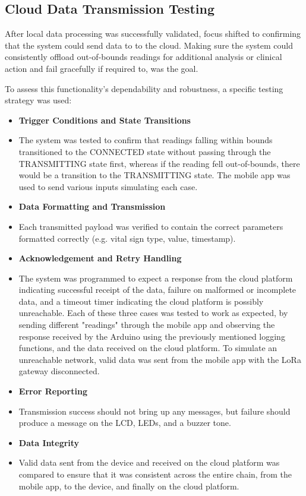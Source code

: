\subsection{Cloud Data Transmission Testing}
After local data processing was successfully validated, focus shifted to confirming that the system could send data to to the cloud. Making sure the system could consistently offload out-of-bounds readings for additional analysis or clinical action and fail gracefully if required to, was the goal.

To assess this functionality's dependability and robustness, a specific testing strategy was used:

\clearpage
\begin{itemize}
	\item \textbf{Trigger Conditions and State Transitions}
	\item[] The system was tested to confirm that readings falling within bounds transitioned to the CONNECTED state without passing through the TRANSMITTING state first, whereas if the reading fell out-of-bounds, there would be a transition to the TRANSMITTING state. The mobile app was used to send various inputs simulating each case.
	\item \textbf{Data Formatting and Transmission}
	\item[] Each transmitted payload was verified to contain the correct parameters formatted correctly (e.g. vital sign type, value, timestamp).
	\item \textbf{Acknowledgement and Retry Handling}
	\item[] The system was programmed to expect a response from the cloud platform indicating successful receipt of the data, failure on malformed or incomplete data, and a timeout timer indicating the cloud platform is possibly unreachable. Each of these three cases was tested to work as expected, by sending different "readings" through the mobile app and observing the response received by the Arduino using the previously mentioned logging functions, and the data received on the cloud platform. To simulate an unreachable network, valid data was sent from the mobile app with the LoRa gateway disconnected.
	\item \textbf{Error Reporting}
	\item[] Transmission success should not bring up any messages, but failure should produce a message on the LCD, LEDs, and a buzzer tone.
	\item \textbf{Data Integrity}
	\item[] Valid data sent from the device and received on the cloud platform was compared to ensure that it was consistent across the entire chain, from the mobile app, to the device, and finally on the cloud platform.
\end{itemize}


